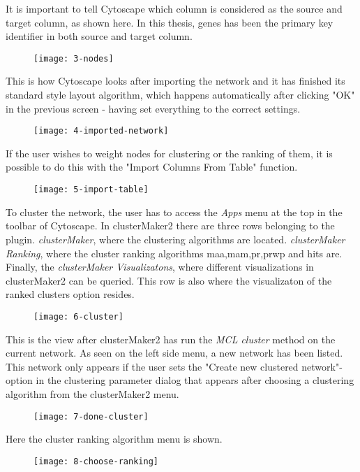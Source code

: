 It is important to tell Cytoscape which column is considered as the source and
target column, as shown here. In this thesis, genes has been the primary key
identifier in both source and target column.
\begin{figure}[H]
    \texttt{[image: 3-nodes]}
\end{figure}

This is how Cytoscape looks after importing the network and it has finished its
standard style layout algorithm, which happens automatically after clicking "OK"
in the previous screen - having set everything to the correct settings.
\begin{figure}[H]
    \texttt{[image: 4-imported-network]}
\end{figure}

If the user wishes to weight nodes for clustering or the ranking of them, it is
possible to do this with the "Import Columns From Table" function.
\begin{figure}[H]
    \texttt{[image: 5-import-table]}
\end{figure}

To cluster the network, the user has to access the \textit{Apps} menu at the top
in the toolbar of Cytoscape. In clusterMaker2 there are three rows belonging
to the plugin. \textit{clusterMaker}, where the clustering algorithms are
located. \textit{clusterMaker Ranking}, where the cluster ranking algorithms
\gls{maa},\gls{mam},\gls{pr},\gls{prwp} and \gls{hits} are. Finally, the
\textit{clusterMaker Visualizatons}, where different visualizations in
clusterMaker2 can be queried. This row is also where the visualizaton of the
ranked clusters option resides.
\begin{figure}[H]
    \texttt{[image: 6-cluster]}
\end{figure}

This is the view after clusterMaker2 has run the \textit{MCL cluster} method on
the current network. As seen on the left side menu, a new network has been
listed. This network only appears if the user sets the "Create new clustered
network"-option in the clustering parameter dialog that appears after choosing a
clustering algorithm from the clusterMaker2 menu.
\begin{figure}[H]
    \texttt{[image: 7-done-cluster]}
\end{figure}

Here the cluster ranking algorithm menu is shown.
\begin{figure}[H]
    \texttt{[image: 8-choose-ranking]}
\end{figure}

